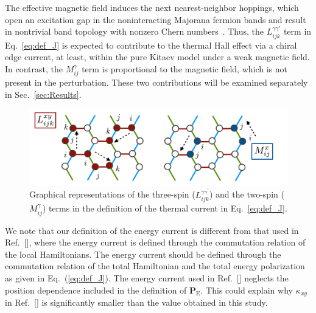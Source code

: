 \documentclass[twocolumn,superscriptaddress,showpacs, longbibliography, aps, prx]{revtex4-2}
\def\vec#1{\boldsymbol #1}
\begin{document}
The effective magnetic field induces the next nearest-neighbor hoppings, which open an excitation gap in the noninteracting Majorana fermion bands and result in nontrivial band topology with nonzero Chern numbers~\cite{Kitaev2006}.
Thus, the $L_{ijk}^{\gamma\gamma'}$ term in Eq.~\eqref{eq:def_J} is expected to contribute to the thermal Hall effect via a chiral edge current, at least, within the pure Kitaev model under a weak magnetic field. 
In contrast, the $M_{ij}^{\gamma}$ term is proportional to the magnetic field, which is not present in the perturbation. 
These two contributions will be examined separately in Sec.~\ref{sec:Results}.

\begin{figure}[tbh]
  \begin{center}
    \includegraphics[width=\linewidth]{Figs/LMterm.pdf}    
  \end{center}
  \caption{
  Graphical representations of the three-spin ($L_{ijk}^{\gamma\gamma^\prime}$) and the two-spin ($M_{ij}^\gamma$) terms in the definition of the thermal current in Eq.~\eqref{eq:def_J}.
  }
  \label{fig:LM_term}
\end{figure}


We note that our definition of the energy current is different from that used in Ref.~[], where the energy current is defined through the commutation relation of the local Hamiltonians.
The energy current should be defined through the commutation relation of the total Hamiltonian and the total energy polarization as given in Eq.~(\ref{eq:def_J}). 
The energy current used in Ref.~[] neglects the position dependence included in the definition of $\vec{P}_{\mathrm{E}}$.
This could explain why $\kappa_{xy}$ in Ref.~[] is significantly smaller than the value obtained in this study.
\end{document}
